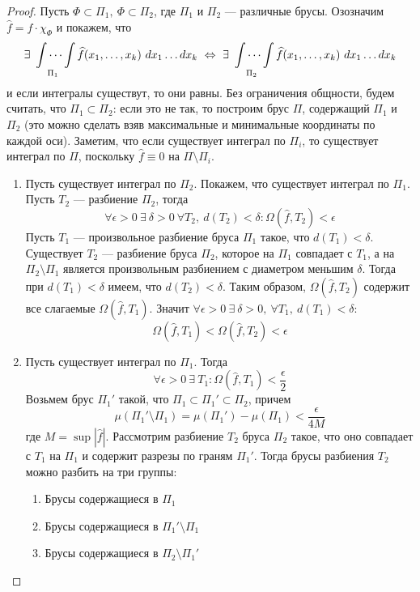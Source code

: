 \begin{proof}
    Пусть $\Phi \subset \Pi_1,\ \Phi\subset \Pi_2$, где $\Pi_1$ и $\Pi_2$ --- различные брусы. Озозначим $\widehat{f}=f\cdot \chi_{\Phi}$ и покажем, что
    \[\exists\ \idotsint\limits_{\Pi_1} \widehat{f}(x_1,\dots,x_k)\ dx_1\dots dx_k\ \Leftrightarrow\ \exists\ \idotsint\limits_{\Pi_2} \widehat{f}(x_1,\dots,x_k)\ dx_1\dots dx_k\]
    и если интегралы существут, то они равны. Без ограничения общности, будем считать, что $\Pi_1\subset \Pi_2$: если это не так, то построим брус $\Pi$, содержащий $\Pi_1$ и $\Pi_2$ (это можно сделать взяв максимальные и минимальные координаты по каждой оси). Заметим, что если существует интеграл по $\Pi_i$, то существует интеграл по $\Pi$, поскольку $\widehat{f}\equiv 0$ на $\Pi\setminus \Pi_i$.
    \begin{enumerate}
        \item Пусть существует интеграл по $\Pi_2$. Покажем, что существует интеграл по $\Pi_1$. Пусть $T_2$ --- разбиение $\Pi_2$, тогда
        \[\forall \epsilon>0\ \exists\ \delta>0\ \forall T_2,\ d(T_2)<\delta: \Omega(\widehat{f}, T_2)<\epsilon\]
        Пусть $T_1$ --- произвольное разбиение бруса $\Pi_1$ такое, что $d(T_1)<\delta$. Существует $T_2$ --- разбиение бруса $\Pi_2$, которое на $\Pi_1$ совпадает с $T_1$, а на $\Pi_2\setminus \Pi_1$ является произвольным разбиением с диаметром меньшим $\delta$. Тогда при $d(T_1)<\delta$ имеем, что $d(T_2)<\delta$. Таким образом, $\Omega(\widehat{f}, T_2)$ содержит все слагаемые $\Omega(\widehat{f}, T_1)$. Значит $\forall \epsilon>0\ \exists\ \delta>0,\ \forall T_1,\ d(T_1)<\delta$:
        \[\Omega(\widehat{f}, T_1)<\Omega(\widehat{f}, T_2)<\epsilon\]
        \item Пусть существует интеграл по $\Pi_1$. Тогда
        \[\forall \epsilon>0\ \exists\ T_1: \Omega(\widehat{f}, T_1)<\frac{\epsilon}{2}\]
        Возьмем брус $\Pi_1'$ такой, что $\Pi_1\subset \Pi_1'\subset \Pi_2$, причем
        \[\mu(\Pi_1'\setminus \Pi_1)=\mu(\Pi_1')-\mu(\Pi_1)<\frac{\epsilon}{4M}\]
        где $M=\sup |\widehat{f}|$. Рассмотрим разбиение $T_2$ бруса $\Pi_2$ такое, что оно совпадает с $T_1$ на $\Pi_1$ и содержит разрезы по граням $\Pi_1'$. Тогда брусы разбиения $T_2$ можно разбить на три группы:
        \begin{enumerate}
            \item Брусы содержащиеся в $\Pi_1$
            \item Брусы содержащиеся в $\Pi_1'\setminus \Pi_1$
            \item Брусы содержащиеся в $\Pi_2\setminus \Pi_1'$

\end{enumerate}
\end{enumerate}
\end{proof}
